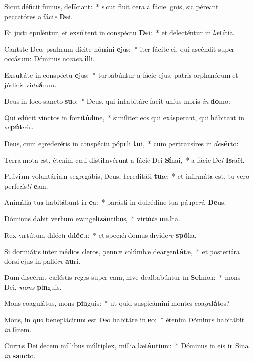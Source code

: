 \item Sicut déficit fumus, de\textbf{fí}ciant:~* sicut fluit cera a fácie ignis, sic péreant peccatóres a fáci\textit{e} \textbf{De}i.
\item Et justi epuléntur, et exsúltent in conspéctu \textbf{De}i:~* et delecténtur in \textit{læ}\textbf{tí}tia.
\item Cantáte Deo, psalmum dícite nómini \textbf{e}jus:~* iter fácite ei, qui ascéndit super occásum: Dóminus no\textit{men} \textbf{il}li.
\item Exsultáte in conspéctu \textbf{e}jus:~* turbabúntur a fácie ejus, patris orphanórum et júdicis vi\textit{du}\textbf{á}rum.
\item Deus in loco sancto \textbf{su}o:~* Deus, qui inhabitáre facit uníus moris \textit{in} \textbf{do}mo:
\item Qui edúcit vinctos in forti\textbf{tú}dine,~* simíliter eos qui exásperant, qui hábitant in \textit{se}\textbf{púl}cris.
\item Deus, cum egrederéris in conspéctu pópuli \textbf{tu}i,~* cum pertransíres in \textit{de}\textbf{sér}to:
\item Terra mota est, étenim cæli distillavérunt a fácie Dei \textbf{Sí}nai,~* a fácie De\textit{i} \textbf{Is}raël.
\item Plúviam voluntáriam segregábis, Deus, hereditáti \textbf{tu}æ:~* et infirmáta est, tu vero perfecís\textit{ti} \textbf{e}am.
\item Animália tua habitábunt in \textbf{e}a:~* parásti in dulcédine tua páupe\textit{ri}, \textbf{De}us.
\item Dóminus dabit verbum evangeli\textbf{zán}tibus,~* virtú\textit{te} \textbf{mul}ta.
\item Rex virtútum dilécti di\textbf{léc}ti:~* et speciéi domus divíde\textit{re} \textbf{spó}lia.
\item Si dormiátis inter médios cleros, pennæ colúmbæ deargen\textbf{tá}tæ,~* et posterióra dorsi ejus in palló\textit{re} \textbf{au}ri.
\item Dum discérnit cæléstis reges super eam, nive dealbabúntur in \textbf{Sel}mon:~* mons Dei, \textit{mons} \textbf{pin}guis.
\item Mons coagulátus, mons \textbf{pin}guis:~* ut quid suspicámini montes coa\textit{gu}\textbf{lá}tos?
\item Mons, in quo beneplácitum est Deo habitáre in \textbf{e}o:~* étenim Dóminus habitábit \textit{in} \textbf{fi}nem.
\item Currus Dei decem míllibus múltiplex, míllia læ\textbf{tán}tium:~* Dóminus in eis in Sina \textit{in} \textbf{sanc}to.
